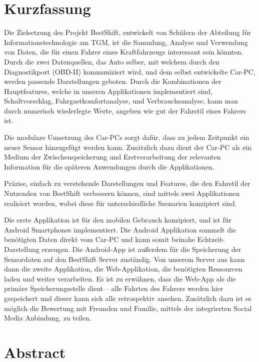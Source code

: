 \section*{Kurzfassung} 

Die Zielsetzung des Projekt BestShift, entwickelt von Schülern der Abteilung für Informationstechnologie am TGM, ist die Sammlung, Analyse und Verwendung von Daten, die für einen Fahrer eines Kraftfahrzeugs interessant sein könnten. Durch die zwei Datenquellen, das Auto selber, mit welchem durch den Diagnostikport (OBD-II) kommuniziert wird, und dem selbst entwickelte Car-PC, werden passende Darstellungen geboten. Durch die Kombinationen der Hauptfeatures, welche in unseren Applikationen implementiert sind, Schaltvorschlag, Fahrgastkomfortanalyse, und Verbrauchsanalyse, kann man durch numerisch wiederlegte Werte, angeben wie gut der Fahrstil eines Fahrers ist.

Die modulare Umsetzung des Car-PCs sorgt dafür, dass zu jedem Zeitpunkt ein neuer Sensor hinzugefügt werden kann. Zusätzlich dazu dient der Car-PC als ein Medium der Zwischenspeicherung und Erstverarbeitung der relevanten Information für die späteren Anwendungen durch die Applikationen. 

Präzise, einfach zu verstehende Darstellungen und Features, die den Fahrstil der Nutzenden von BestShift verbessern können, sind mittels zwei Applikationen realisiert worden, wobei diese für unterschiedliche Szenarien konzipiert sind. 

Die erste Applikation ist für den mobilen Gebrauch konzipiert, und ist für Android Smartphones implementiert. Die Android Applikation sammelt die benötigten Daten direkt vom Car-PC und kann somit beinahe Echtzeit-Darstellung erzeugen. Die Android-App ist außerdem für die Speicherung der Sensordaten auf den BestShift Server zuständig. Von unserem Server aus kann dann die zweite Applikation, die Web-Applikation, die benötigten Ressourcen laden und weiter verarbeiten. Es ist zu erwähnen, dass die Web-App als die primäre Speicherungsstelle dient – alle Fahrten des Fahrers werden hier gespeichert und dieser kann sich alle retrospektiv ansehen. Zusätzlich dazu ist es möglich die Bewertung mit Freunden und Familie, mittels der integrierten Social Media Anbindung, zu teilen. 

\section*{Abstract} 

